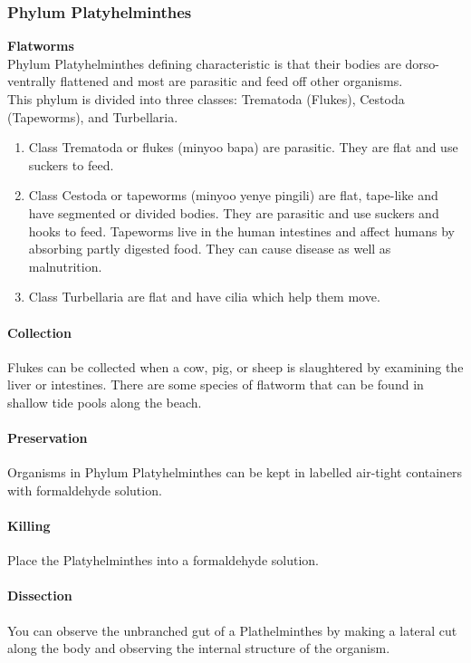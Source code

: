 \begin{multicols}{2}

\subsubsection{Phylum Platyhelminthes}
\textbf{Flatworms}\\ 
Phylum Platyhelminthes defining characteristic is that their bodies are dorso-ventrally flattened and most are parasitic and feed off other organisms.\\
This phylum is divided into three classes: Trematoda (Flukes), Cestoda (Tapeworms), and Turbellaria.
\begin{enumerate}
\item{Class Trematoda or flukes (minyoo bapa) are parasitic. They are flat and use suckers to feed.}
\item{Class Cestoda or tapeworms (minyoo yenye pingili) are flat, tape-like and have segmented or divided bodies. They are parasitic and use suckers and hooks to feed. Tapeworms live in the human intestines and affect humans by absorbing partly digested food. They can cause disease as well as malnutrition.}
\item{Class Turbellaria are flat and have cilia which help them move.}
\end{enumerate}

\paragraph{Collection}
 Flukes can be collected when a cow, pig, or sheep is slaughtered by examining the liver or intestines. There are some species of flatworm that can be found in shallow tide pools along the beach. 

\paragraph{Preservation} 
Organisms in Phylum Platyhelminthes can be kept in labelled air-tight containers with formaldehyde solution.

\paragraph{Killing}
Place the Platyhelminthes into a formaldehyde solution.

\paragraph{Dissection}
You can observe the unbranched gut of a Plathelminthes by making a lateral cut along the body and observing the internal structure of the organism.


\end{multicols}
